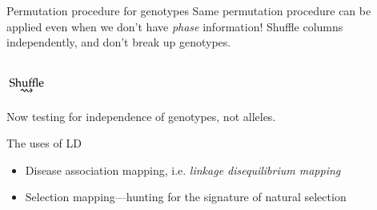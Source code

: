 \documentclass[serif,mathserif,professionalfonts,svgnames]{beamer}
\begin{document}
\begin{frame}{Permutation procedure for genotypes}
  Same permutation procedure can be applied even when we don't have
  \emph{phase} information!  Shuffle columns independently, and don't
  break up genotypes.
 \vspace{-0.3cm}
  \begin{center}
     \bigskip \\
    {\Huge $\: \overset{\text{\normalsize Shuffle}}{\rightsquigarrow} \:$}
  \end{center} \vspace{-0.2cm}
  Now testing for independence of genotypes, not alleles.
\end{frame}



\begin{frame}{The uses of LD}
  \begin{itemize}
  \item Disease association mapping, i.e. \emph{linkage disequilibrium
      mapping}
  \item Selection mapping---hunting for the signature of natural
    selection
 \end{itemize}
\end{frame}
\end{document}
